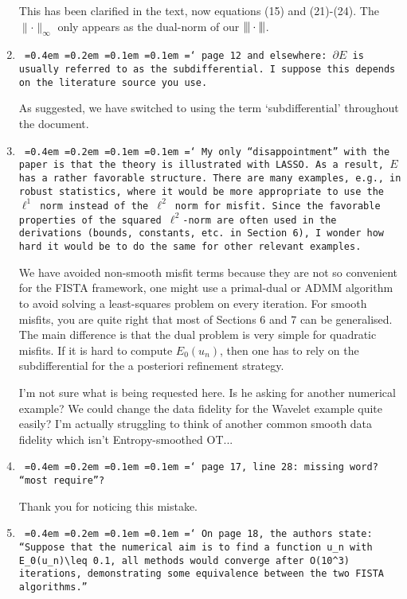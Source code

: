 \documentclass[12pt]{article}
\newcommand*\justify{%
	\fontdimen2\font=0.4em%
	\fontdimen3\font=0.2em%
	\fontdimen4\font=0.1em%
	\fontdimen7\font=0.1em%
	\hyphenchar\font=`\-%
}
\newcommand{\review}[1]{\texttt{\justify{#1}}}
\newcommand{\todo}[1]{{\color{red} #1}}
\begin{document}
\begin{enumerate}
	This has been clarified in the text, now equations (15) and (21)-(24). The $\lVert\cdot\rVert_\infty$ only appears as the dual-norm of our ${\vert\kern-0.25ex\vert\kern-0.25ex\vert \cdot \vert\kern-0.25ex\vert\kern-0.25ex\vert}$.
	
	\item \review{page 12 and elsewhere: $\partial E$ is usually referred to as the subdifferential. I suppose this depends on the literature source you use.}
	
	As suggested, we have switched to using the term `subdifferential' throughout the document.
	
	\item \review{My only ``disappointment'' with the paper is that the theory is illustrated with LASSO. As a result, $E$ has a rather favorable structure. There are many examples, e.g., in robust statistics, where it would be more appropriate to use the $\ell^1$ norm instead of the $\ell^2$ norm for misfit. Since the favorable properties of the squared $\ell^2$-norm are often used in the derivations (bounds, constants, etc. in Section 6), I wonder how hard it would be to do the same for other relevant examples.}
	
	We have avoided non-smooth misfit terms because they are not so convenient for the FISTA framework, one might use a primal-dual or ADMM algorithm to avoid solving a least-squares problem on every iteration. For smooth misfits, you are quite right that most of Sections 6 and 7 can be generalised. The main difference is that the dual problem is very simple for quadratic misfits. If it is hard to compute $E_0(u_n)$, then one has to rely on the subdifferential for the a posteriori refinement strategy.
	
	\todo{I'm not sure what is being requested here. Is he asking for another numerical example? We could change the data fidelity for the Wavelet example quite easily? I'm actually struggling to think of another common smooth data fidelity which isn't Entropy-smoothed OT...}
	
	\item \review{page 17, line 28: missing word? ``most require''?}
	
	Thank you for noticing this mistake.
	
	\item \review{On page 18, the authors state: ``Suppose that the numerical aim is to find a function $u_n$ with $E_0(u_n)\leq 0.1$, all methods would converge after $O(10^3)$ iterations, demonstrating some equivalence between the two FISTA algorithms.''}
	

\end{enumerate}
\end{document}

